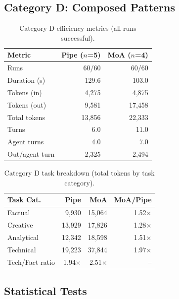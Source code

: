 \documentclass{article}
\begin{document}
\subsection{Category D: Composed Patterns}

\begin{table}[H]
\centering
\caption{Category D efficiency metrics (all runs successful).}
\label{tab:catD}
{\small
\begin{tabular}{@{}lrr@{}}
\toprule
\textbf{Metric} & \textbf{Pipe} ($n$=5) & \textbf{MoA} ($n$=4) \\
\midrule
Runs & 60/60 & 60/60 \\
Duration (s) & 129.6 & 103.0 \\
Tokens (in) & 4,275 & 4,875 \\
Tokens (out) & 9,581 & 17,458 \\
Total tokens & 13,856 & 22,333 \\
Turns & 6.0 & 11.0 \\
Agent turns & 4.0 & 7.0 \\
Out/agent turn & 2,325 & 2,494 \\
\bottomrule
\end{tabular}
}
\end{table}

\begin{table}[H]
\centering
\caption{Category D task breakdown (total tokens by task category).}
\label{tab:catD_tasks}
{\small
\begin{tabular}{@{}lrrr@{}}
\toprule
\textbf{Task Cat.} & \textbf{Pipe} & \textbf{MoA} & \textbf{MoA/Pipe} \\
\midrule
Factual & 9,930 & 15,064 & 1.52$\times$ \\
Creative & 13,929 & 17,826 & 1.28$\times$ \\
Analytical & 12,342 & 18,598 & 1.51$\times$ \\
Technical & 19,223 & 37,844 & 1.97$\times$ \\
Tech/Fact ratio & 1.94$\times$ & 2.51$\times$ & -- \\
\bottomrule
\end{tabular}
}
\end{table}

\subsection{Statistical Tests}
\end{document}
